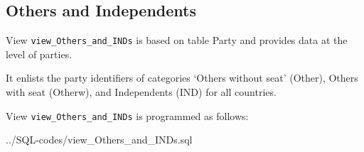 \subsection{Others and Independents}\label{view_Others_and_INDs}
View \texttt{\footnotesize view\_Others\_and\_INDs} is based on table Party and provides data at the level of parties.

It enlists the party identifiers of categories `Others without seat' (Other), Others with seat (Otherw), and Independents (IND) for all countries. 

View \texttt{\footnotesize view\_Others\_and\_INDs} is programmed as follows:

%
{../SQL-codes/view_Others_and_INDs.sql}






